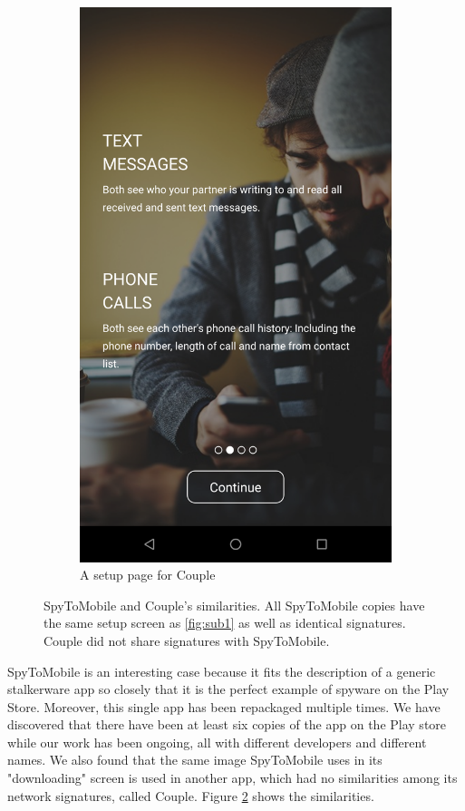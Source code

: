 \documentclass[acmtog]{acmart}
\begin{document}
\begin{figure}
\begin{subfigure}{0.5\columnwidth}
		\includegraphics[width=0.9\linewidth]{../images/Couple_like_spy2mobile.png}
		\caption{A setup page for Couple}
		\label{fig:sub2}
	\end{subfigure}
	\caption{SpyToMobile and Couple's similarities. All SpyToMobile copies have 
	the same setup screen as \ref{fig:sub1} as well as identical signatures. 
	Couple did not share signatures with SpyToMobile.}
	\label{fig:spytomobile_couple}
\end{figure}


SpyToMobile is an interesting case 
because it fits the description of a generic stalkerware app so closely that it 
is the perfect example of spyware on the Play Store. Moreover, this single app 
has been repackaged multiple times. We have discovered that there have been at 
least six copies of the app on the Play store while our work has been ongoing, 
all with different developers and 
different names. We also found that the same image SpyToMobile uses in its 
"downloading" screen is used in another app, which had no similarities among 
its network signatures, called Couple. Figure \ref{fig:spytomobile_couple} 
shows the similarities.
\end{document}
